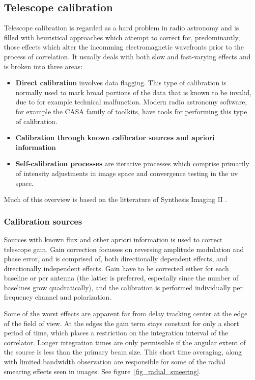 \documentclass[a4paper,10pt]{report}
\begin{document}
\subsection{Telescope calibration}
Telescope calibration is regarded as a hard problem in radio astronomy and is filled with heuristical approaches which attempt to correct for, predominantly, those effects which alter the
incomming electromagnetic wavefronts prior to the process of correlation. It usually deals with both slow and fast-varying effects and is broken into three areas:
\begin{itemize}
 \item \textbf{Direct calibration} involves data flagging. This type of calibration is normally used to mark broad portions of the data that is known to be invalid, due to for example
 technical malfunction. Modern radio astronomy software, for example the CASA family of toolkits, have tools for performing this type of calibration.
 \item \textbf{Calibration through known calibrator sources and apriori information} 
 \item \textbf{Self-calibration processes} are iterative processes which comprise primarily of intensity adjustments in image space and convergence testing in the uv space.
\end{itemize}

Much of this overview is based on the litterature of Synthesis Imaging II \cite[Lectures 5, 8 and 10]{taylor1999synthesis}.

\subsubsection{Calibration sources}
 Sources with known flux and other apriori information is used to correct telescope gain. Gain correction focusses on reversing amplitude modulation and phase error, and is 
 comprised of, both directionally dependent effects, and directionally independent effects. Gain have to be corrected either for each baseline or per antenna (the latter is 
 preferred, especially since the number of baselines grow quadratically), and the calibration is performed individually per frequency channel and polarization.
 
 Some of the worst effects are apparent far from delay tracking center at the edge of the field of view. At the edges the gain term stays constant for only a short period of time, which
 places a restriction on the integration interval of the correlator. Longer integration times are only permissible if the angular extent of the source is less than the primary beam size.
 This short time averaging, along with limited bandwidth observation are responsible for some of the radial smearing effects seen in images. See figure~\ref{fig_radial_smeering}.
 
\end{document}
